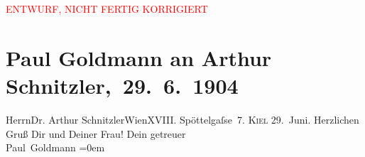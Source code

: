 
\begin{center}
            \textcolor{red}{ENTWURF, NICHT FERTIG KORRIGIERT}
                      \end{center}
            
         
         \renewcommand{\erwaehntePersonen}{Personen: Olga Schnitzler}
         \renewcommand{\erwaehnteOrte}{Orte: Edmund-Weiß-Gasse, Kiel, Wien}
         \renewcommand{\erwaehnteWerke}{}
               \section[ Paul Goldmann an Arthur Schnitzler, 29. 6. 1904]{ Paul Goldmann an Arthur Schnitzler, 29. 6. 1904}\nopagebreak{}\rehead{ }\begin{ledgroupsized}[t]{13cm}\normalsize\beginnumbering \toendnotes[C]{\smallbreak\pagebreak[2]} 
\toendnotes[C]{\smallbreak}\pstart{}{\pb}Herrn\pend{}\pstart{}Dr. Arthur Schnitzler\pend{}\pstart{}Wien\pend{}\pstart{}XVIII. Spöttelgaſse 7.\pend{}{\bigskip}\pstart
           {\pb}\textsc{Kiel}{ }29. Juni.\pend
           \pstart
           Herzlichen Gruß Dir und Deiner Frau!\pend
           \pstart
           Dein getreuer {\\[\baselineskip]}\spacefill\mbox{Paul Goldmann}\pend
           \leftskip=0em{}
         
         \endnumbering{}\end{ledgroupsized}\begin{anhang}\end{anhang}\newcommand{\dateiname}{L03446}\newcommand{\titel}{Paul Goldmann an Arthur Schnitzler, 29. 6. 1904}\newcommand{\editorInnen}{Martin Anton Müller und Laura Untner}
      